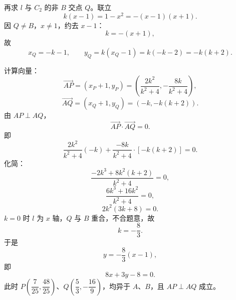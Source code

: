 \begin{answer}
再求 $l$ 与 $C_2$ 的非 $B$ 交点 $Q$。联立
\nopagebreak[4]
\[k(x-1)=1-x^2=-(x-1)(x+1).\]
因 $Q\neq B$，$x\neq1$，约去 $x-1$：
\nopagebreak[4]
\[k=-(x+1),\]
故
\nopagebreak[4]
\[x_Q=-k-1,\qquad y_Q=k(x_Q-1)=k(-k-2)=-k(k+2).\]

计算向量：
\nopagebreak[4]
\[\overrightarrow{AP}=\left(x_P+1,y_P\right)
=\left(\frac{2k^2}{k^2+4},-\frac{8k}{k^2+4}\right),\]
\nopagebreak[4]
\[\overrightarrow{AQ}=\left(x_Q+1,y_Q\right)
=(-k,-k(k+2)).\]
由 $AP\perp AQ$，
\nopagebreak[4]
\[\overrightarrow{AP}\cdot\overrightarrow{AQ}=0.\]
即
\nopagebreak[4]
\[\frac{2k^2}{k^2+4}(-k)+\frac{-8k}{k^2+4}\cdot[-k(k+2)]=0.\]
化简：
\nopagebreak[4]
\[\frac{-2k^3+8k^2(k+2)}{k^2+4}=0,\]
\nopagebreak[4]
\[\frac{6k^3+16k^2}{k^2+4}=0,\]
\nopagebreak[4]
\[2k^2(3k+8)=0.\]
$k=0$ 时 $l$ 为 $x$ 轴，$Q$ 与 $B$ 重合，不合题意，故
\nopagebreak[4]
\[k=-\frac83.\]
于是
\nopagebreak[4]
\[y=-\frac83(x-1),\]
即
\nopagebreak[4]
\[8x+3y-8=0.\]
此时 $P\left(\dfrac7{25},\dfrac{48}{25}\right)$、$Q\left(\dfrac53,-\dfrac{16}9\right)$，均异于 $A$、$B$，且 $AP\perp AQ$ 成立。



\end{answer}
